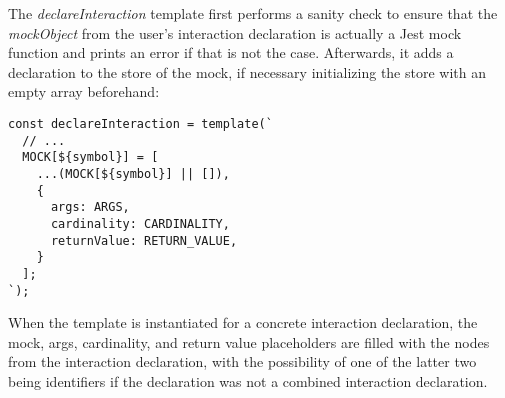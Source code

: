 The \textit{declareInteraction} template first
performs a sanity check to ensure that
the \textit{mockObject} from the user's interaction declaration
is actually a Jest mock function and
prints an error if that is not the case.
Afterwards, it adds a declaration to the store of the mock,
if necessary initializing the store with an empty array beforehand:
\begin{verbatim}
const declareInteraction = template(`
  // ...
  MOCK[${symbol}] = [
    ...(MOCK[${symbol}] || []),
    {
      args: ARGS,
      cardinality: CARDINALITY,
      returnValue: RETURN_VALUE,
    }
  ];
`);
\end{verbatim}
When the template is instantiated for a concrete interaction declaration,
the mock, args, cardinality, and return value placeholders
are filled with the nodes from the interaction declaration,
with the possibility of one of the latter two being  identifiers
if the declaration was not a combined interaction declaration.
